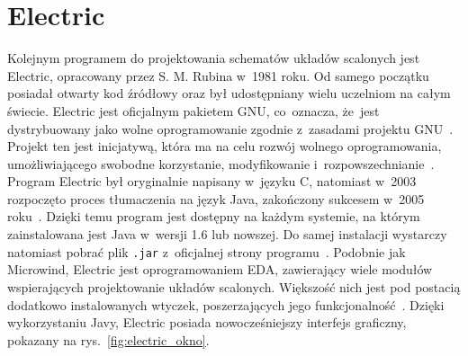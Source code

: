 \section{Electric}

Kolejnym programem do projektowania schematów układów scalonych jest Electric,
opracowany przez S. M. Rubina w~1981 roku.
Od samego początku posiadał otwarty kod źródłowy
oraz był udostępniany wielu uczelniom na całym świecie.
Electric jest oficjalnym pakietem GNU, co~oznacza,
że~jest dystrybuowany jako wolne oprogramowanie zgodnie z~zasadami projektu GNU~\cite{electric_gnu}.
Projekt ten jest inicjatywą, która ma na celu rozwój wolnego oprogramowania,
umożliwiającego swobodne korzystanie, modyfikowanie i~rozpowszechnianie~\cite{gnu_site}.
Program Electric był oryginalnie napisany w~języku C,
natomiast w~2003 rozpoczęto proces tłumaczenia na język Java, zakończony sukcesem w~2005 roku~\cite{electric_gnu}.
Dzięki temu program jest dostępny na każdym systemie,
na którym zainstalowana jest Java w~wersji 1.6 lub nowszej.
Do samej instalacji wystarczy natomiast pobrać plik \texttt{.jar} z~oficjalnej strony programu~\cite{electric_sfs}.
Podobnie jak Microwind, Electric jest oprogramowaniem EDA, zawierający wiele modułów wspierających projektowanie układów scalonych.
Większość nich jest pod postacią dodatkowo instalowanych wtyczek,
poszerzających jego funkcjonalność~\cite{electric_sfs, electric_gnu}.
Dzięki wykorzystaniu Javy, Electric posiada nowocześniejszy interfejs graficzny,
pokazany na rys.~\ref{fig:electric_okno}.

